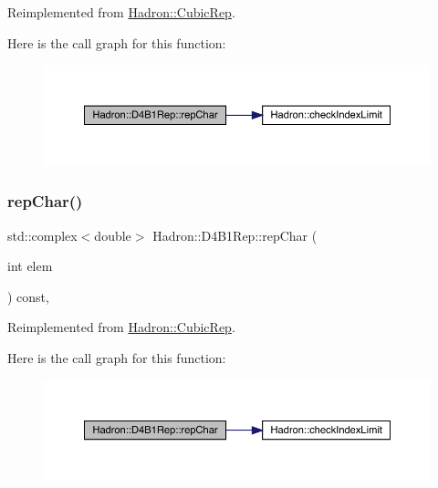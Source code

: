 Reimplemented from \mbox{\hyperlink{structHadron_1_1CubicRep_af45227106e8e715e84b0af69cd3b36f8}{Hadron\+::\+Cubic\+Rep}}.

Here is the call graph for this function\+:
\nopagebreak
\begin{figure}[H]
\begin{center}
\leavevmode
\includegraphics[width=350pt]{d6/d99/structHadron_1_1D4B1Rep_ae49fe8e7bfc46c213d32d7c0d99236f1_cgraph}
\end{center}
\end{figure}
\mbox{\label{structHadron_1_1D4B1Rep_ae49fe8e7bfc46c213d32d7c0d99236f1}} 
\subsubsection{\texorpdfstring{repChar()}{repChar()}\hspace{0.1cm}{\footnotesize\ttfamily [3/3]}}
{\footnotesize\ttfamily std\+::complex$<$double$>$ Hadron\+::\+D4\+B1\+Rep\+::rep\+Char (\begin{DoxyParamCaption}\item[{int}]{elem }\end{DoxyParamCaption}) const\hspace{0.3cm}{\ttfamily [inline]}, {\ttfamily [virtual]}}



Reimplemented from \mbox{\hyperlink{structHadron_1_1CubicRep_af45227106e8e715e84b0af69cd3b36f8}{Hadron\+::\+Cubic\+Rep}}.

Here is the call graph for this function\+:
\nopagebreak
\begin{figure}[H]
\begin{center}
\leavevmode
\includegraphics[width=350pt]{d6/d99/structHadron_1_1D4B1Rep_ae49fe8e7bfc46c213d32d7c0d99236f1_cgraph}
\end{center}
\end{figure}
\mbox{\label{structHadron_1_1D4B1Rep_aaee6044952bae4a4d852115d4e1add07}} 

